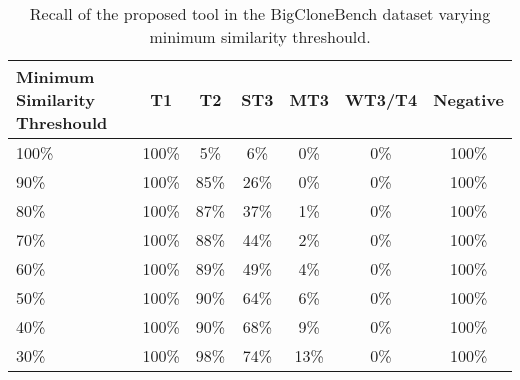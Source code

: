 \begin{table}
\begin{tabular}{ | m{6em} | c | c | c | c | c | c | }

\hline

\textbf{Minimum Similarity Threshould} & \textbf{T1} & \textbf{T2} & \textbf{ST3} & \textbf{MT3}
& \textbf{WT3/T4} & \textbf{Negative} \\ \hline 

100\% & 100\% & 5\% & 6\% & 0\% & 0\% & 100\% \\ \hline
90\% & 100\% & 85\% & 26\% & 0\% & 0\% & 100\% \\ \hline
80\% & 100\% & 87\% & 37\% & 1\% & 0\% & 100\% \\ \hline
70\% & 100\% & 88\% & 44\% & 2\% & 0\% & 100\% \\ \hline
60\% & 100\% & 89\% & 49\% & 4\% & 0\% & 100\% \\ \hline
50\% & 100\% & 90\% & 64\% & 6\% & 0\% & 100\% \\ \hline
40\% & 100\% & 90\% & 68\% & 9\% & 0\% & 100\% \\ \hline
30\% & 100\% & 98\% & 74\% & 13\% & 0\% & 100\% \\ \hline

\hline
\end{tabular}
\caption{Recall of the proposed tool in the BigCloneBench dataset varying minimum similarity threshould.}
\label{tab:bigclone}
\end{table}
